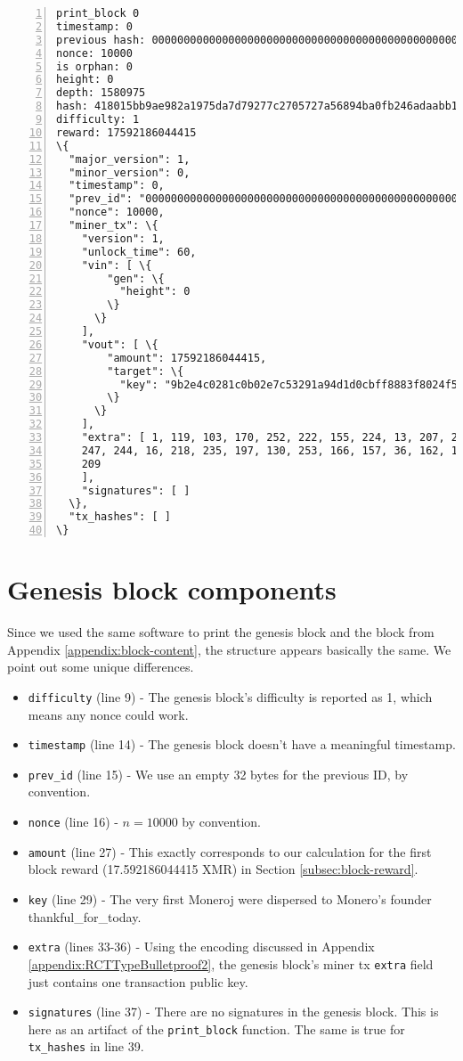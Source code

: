 \begin{appendices}
\begin{Verbatim}[commandchars=\\\{\}, numbers=left]
print_block 0
timestamp: 0
previous hash: 0000000000000000000000000000000000000000000000000000000000000000
nonce: 10000
is orphan: 0
height: 0
depth: 1580975
hash: 418015bb9ae982a1975da7d79277c2705727a56894ba0fb246adaabb1f4632e3
difficulty: 1
reward: 17592186044415
\{
  "major_version": 1,
  "minor_version": 0,
  "timestamp": 0,
  "prev_id": "0000000000000000000000000000000000000000000000000000000000000000",
  "nonce": 10000,
  "miner_tx": \{
    "version": 1,
    "unlock_time": 60,
    "vin": [ \{
        "gen": \{
          "height": 0
        \}
      \}
    ],
    "vout": [ \{
        "amount": 17592186044415,
        "target": \{
          "key": "9b2e4c0281c0b02e7c53291a94d1d0cbff8883f8024f5142ee494ffbbd088071"
        \}
      \}
    ],
    "extra": [ 1, 119, 103, 170, 252, 222, 155, 224, 13, 207, 208, 152, 113, 94, 188, 
    247, 244, 16, 218, 235, 197, 130, 253, 166, 157, 36, 162, 142, 157, 11, 200, 144, 
    209
    ],
    "signatures": [ ]
  \},
  "tx_hashes": [ ]
\}
\end{Verbatim}



\section*{Genesis block components}

Since we used the same software to print the genesis block and the block from Appendix \ref{appendix:block-content}, the structure appears basically the same. We point out some unique differences.

\begin{itemize}
	\item {\tt difficulty} (line 9) - The genesis block's difficulty is reported as 1, which means any nonce could work.
	\item {\tt timestamp} (line 14) - The genesis block doesn't have a meaningful timestamp.
	\item {\tt prev\_id} (line 15) - We use an empty 32 bytes for the previous ID, by convention.
	\item {\tt nonce} (line 16) - $n = 10000$ by convention.
	\item {\tt amount} (line 27) - This exactly corresponds to our calculation for the first block reward (17.592186044415 XMR) in Section \ref{subsec:block-reward}.
	\item {\tt key} (line 29) - The very first Moneroj were dispersed to Monero's founder thankful\_for\_today.
	\item {\tt extra} (lines 33-36) - Using the encoding discussed in Appendix \ref{appendix:RCTTypeBulletproof2}, the genesis block's miner tx {\tt extra} field just contains one transaction public key.
	\item {\tt signatures} (line 37) - There are no signatures in the genesis block. This is here as an artifact of the {\tt print\_block} function. The same is true for {\tt tx\_hashes} in line 39.
\end{itemize}
\fi

\end{appendices}